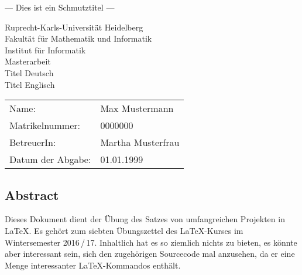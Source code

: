 \documentclass{scrreprt}
\begin{document}
	
\begin{titlepage}
	\vspace*{2cm}
	\large
	\begin{center}
		---	Dies ist ein Schmutztitel ---
	\end{center}
\end{titlepage}

\begin{titlepage}
	
	\begin{centering}
		\doublespacing
		\begin{bfseries}
			\Large 
			Ruprecht-Karls-Universität Heidelberg \\
			Fakultät für Mathematik und Informatik \\ 
			Institut für Informatik \\[3cm]
			Masterarbeit \\
			\Huge 
			Titel Deutsch \\
			Titel Englisch \\
		\end{bfseries}
	\end{centering}
	
	\begin{table}[b]
		\doublespacing
		\large
		\begin{tabular}{ll}
			Name: & Max Mustermann \\
			Matrikelnummer: & 0000000 \\
			BetreuerIn: & Martha Musterfrau \\
			Datum der Abgabe: & 01.01.1999
		\end{tabular}
	\end{table}
	
\end{titlepage}


\subsection*{Abstract}
Dieses Dokument dient der Übung des Satzes von umfangreichen Projekten in \LaTeX{}. Es gehört zum siebten Übungszettel des \LaTeX-Kurses im Wintersemester 2016\,/\,17. Inhaltlich hat es so ziemlich nichts zu bieten, es könnte aber interessant sein, sich den zugehörigen Sourcecode mal anzusehen, da er eine Menge interessanter \LaTeX-Kommandos enthält.


\tableofcontents







\appendix 
\listoffigures 
\listoftables

\printindex
\end{document}
